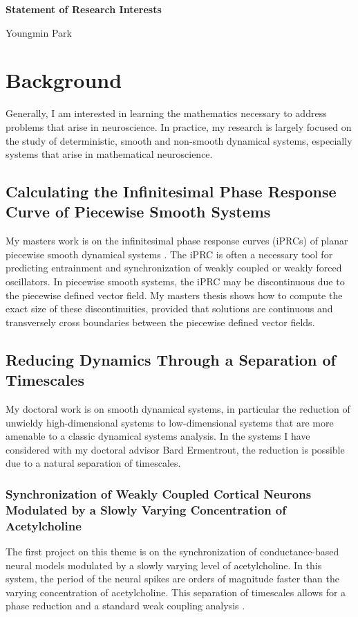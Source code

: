 \documentclass[a4paper,11pt]{article}
\begin{document}
\begin{center}
\Large \textbf{Statement of Research Interests}

\Large Youngmin Park
\end{center}


\section{Background}
Generally, I am interested in learning the mathematics necessary to address problems that arise in neuroscience. In practice, my research is largely focused on the study of deterministic, smooth and non-smooth dynamical systems, especially systems that arise in mathematical neuroscience.

\subsection{Calculating the Infinitesimal Phase Response Curve of Piecewise Smooth Systems}
My masters work is on the infinitesimal phase response curves (iPRCs) of planar piecewise smooth dynamical systems \cite{park2013infinitesimal}. The iPRC is often a necessary tool for predicting entrainment and synchronization of weakly coupled or weakly forced oscillators. In piecewise smooth systems, the iPRC may be discontinuous due to the piecewise defined vector field. My masters thesis shows how to compute the exact size of these discontinuities, provided that solutions are continuous and transversely cross boundaries between the piecewise defined vector fields.

\subsection{Reducing Dynamics Through a Separation of Timescales}
My doctoral work is on smooth dynamical systems, in particular the reduction of unwieldy high-dimensional systems to low-dimensional systems that are more amenable to a classic dynamical systems analysis. In the systems I have considered with my doctoral advisor Bard Ermentrout, the reduction is possible due to a natural separation of timescales.

\subsubsection{Synchronization of Weakly Coupled Cortical Neurons Modulated by a Slowly Varying Concentration of Acetylcholine}
The first project on this theme is on the synchronization of conductance-based neural models modulated by a slowly varying level of acetylcholine. In this system, the period of the neural spikes are orders of magnitude faster than the varying concentration of acetylcholine. This separation of timescales allows for a phase reduction and a standard weak coupling analysis \cite{park2016weakly}.
\end{document}
